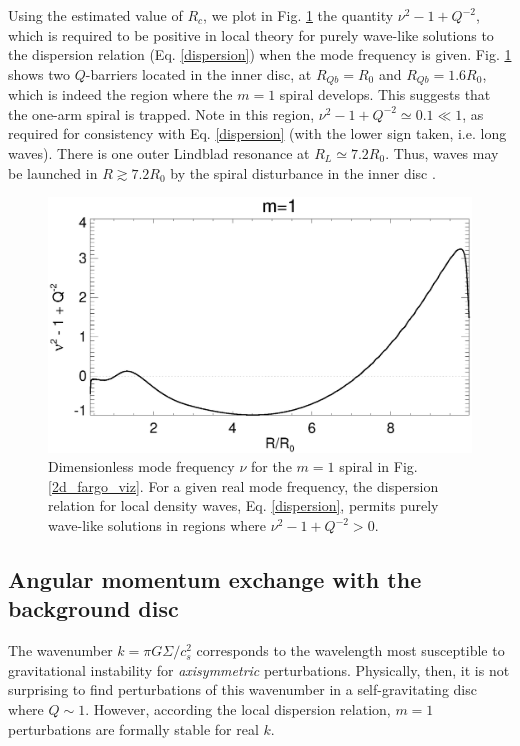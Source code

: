
Using the estimated value of $R_c$, we plot in
Fig. \ref{fargo_qbarrier} the quantity $\nu^2 - 1 + Q^{-2}$, which is
required to be positive in local theory for purely wave-like
solutions to the dispersion relation (Eq. \ref{dispersion}) when the
mode frequency is given. %
Fig. \ref{fargo_qbarrier} shows two $Q$-barriers located in
the inner disc, at $R_{Qb}=R_0$ and $R_{Qb}=1.6R_0$, which is indeed the
region where the $m=1$ spiral develops. This suggests that the one-arm
spiral is trapped. Note in this region, $\nu^2 - 1 +
Q^{-2}\simeq 0.1\ll 1$, as required for consistency with
Eq. \ref{dispersion} (with the lower sign taken, i.e. long waves).  
There is one outer Lindblad resonance at $R_L\simeq
7.2R_0$. Thus, waves may be launched in $R\gtrsim 7.2R_0$ by the  
spiral disturbance in the inner disc \citep{lin11b}. 

\begin{figure}
  \includegraphics[width=\linewidth]{figures/m1_analysis_Qbar_fargo.ps} 
  \caption{Dimensionless mode frequency $\nu$ for the $m=1$ spiral in
    Fig. \ref{2d_fargo_viz}. For a given real mode frequency, the
    dispersion relation for local density waves, Eq. \ref{dispersion},
    permits purely wave-like solutions in regions where $\nu^2 - 1 +
    Q^{-2}>0$.    
    \label{fargo_qbarrier}} 
\end{figure}

\subsection{Angular momentum exchange with the background disc} 
The wavenumber $k = \pi G\Sigma/c_s^2$ corresponds to the
wavelength most susceptible to gravitational instability for
\emph{axisymmetric} perturbations. Physically, then, it is not
surprising to find perturbations of this wavenumber in a
self-gravitating disc where $Q\sim 1$. However, according the
local dispersion relation, $m=1$ perturbations are formally stable for 
real $k$.  


